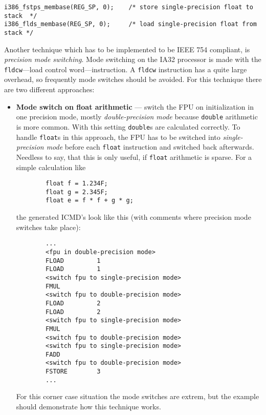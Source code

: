\begin{verbatim}
i386_fstps_membase(REG_SP, 0);    /* store single-precision float to stack  */
i386_flds_membase(REG_SP, 0);     /* load single-precision float from stack */
\end{verbatim}

Another technique which has to be implemented to be IEEE 754
compliant, is \textit{precision mode switching}. Mode switching on the
IA32 processor is made with the \texttt{fldcw}---load control
word---instruction. A \texttt{fldcw} instruction has a quite large
overhead, so frequently mode switches should be avoided. For this
technique there are two different approaches:

\begin{itemize}
 \item \textbf{Mode switch on float arithmetic} --- switch the FPU on
 initialization in one precision mode, mostly \textit{double-precision
 mode} because \texttt{double} arithmetic is more common. With this
 setting \texttt{double}s are calculated correctly. To handle
 \texttt{float}s in this approach, the FPU has to be switched into
 \textit{single-precision mode} before each \texttt{float} instruction
 and switched back afterwards. Needless to say, that this is only
 useful, if \texttt{float} arithmetic is sparse. For a simple
 calculation like

 \begin{verbatim}
        float f = 1.234F;
        float g = 2.345F;
        float e = f * f + g * g;
 \end{verbatim}        

 the generated ICMD's look like this (with comments where precision
 mode switches take place):

 \begin{verbatim}
        ...
        <fpu in double-precision mode>
        FLOAD         1
        FLOAD         1
        <switch fpu to single-precision mode>
        FMUL         
        <switch fpu to double-precision mode>
        FLOAD         2
        FLOAD         2
        <switch fpu to single-precision mode>
        FMUL         
        <switch fpu to double-precision mode>
        <switch fpu to single-precision mode>
        FADD         
        <switch fpu to double-precision mode>
        FSTORE        3
        ...
 \end{verbatim}

 For this corner case situation the mode switches are extrem, but the
 example should demonstrate how this technique works.


\end{itemize}
